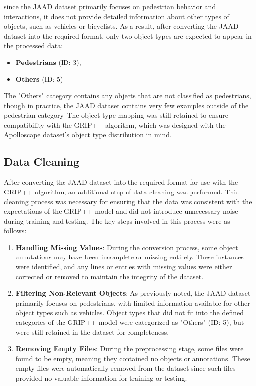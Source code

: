  since the JAAD dataset primarily focuses on pedestrian behavior and interactions, it does not provide detailed information about other types of objects, such as vehicles or bicyclists. As a result, after converting the JAAD dataset into the required format, only two object types are expected to appear in the processed data:

\begin{itemize}
    \item \textbf{Pedestrians} (ID: 3),
    \item \textbf{Others} (ID: 5)
\end{itemize}


The "Others" category contains any objects that are not classified as pedestrians, though in practice, the JAAD dataset contains very few examples outside of the pedestrian category. The object type mapping was still retained to ensure compatibility with the GRIP++ algorithm, which was designed with the Apolloscape dataset's object type distribution in mind.

\subsection{Data Cleaning}

\tab After converting the JAAD dataset into the required format for use with the GRIP++ algorithm, an additional step of data cleaning was performed. This cleaning process was necessary for ensuring that the data was consistent with the expectations of the GRIP++ model and did not introduce unnecessary noise during training and testing. The key steps involved in this process were as follows:

\begin{enumerate}
    \item \textbf{Handling Missing Values}: During the conversion process, some object annotations may have been incomplete or missing entirely. These instances were identified, and any lines or entries with missing values were either corrected or removed to maintain the integrity of the dataset.
    \item \textbf{Filtering Non-Relevant Objects}: As previously noted, the JAAD dataset primarily focuses on pedestrians, with limited information available for other object types such as vehicles. Object types that did not fit into the defined categories of the GRIP++ model were categorized as "Others" (ID: 5), but were still retained in the dataset for completeness.
    \item \textbf{Removing Empty Files}: During the preprocessing stage, some files were found to be empty, meaning they contained no objects or annotations. These empty files were automatically removed from the dataset since such files provided no valuable information for training or testing.
\end{enumerate}

